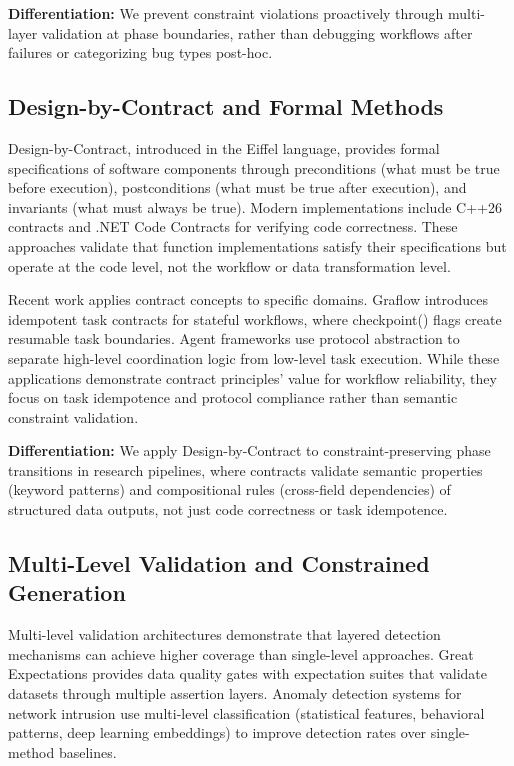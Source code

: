 \textbf{Differentiation:} We prevent constraint violations proactively through multi-layer validation at phase boundaries, rather than debugging workflows after failures or categorizing bug types post-hoc.

\subsection{Design-by-Contract and Formal Methods}

Design-by-Contract, introduced in the Eiffel language, provides formal specifications of software components through preconditions (what must be true before execution), postconditions (what must be true after execution), and invariants (what must always be true). Modern implementations include C++26 contracts and .NET Code Contracts for verifying code correctness. These approaches validate that function implementations satisfy their specifications but operate at the code level, not the workflow or data transformation level.

Recent work applies contract concepts to specific domains. Graflow introduces idempotent task contracts for stateful workflows, where checkpoint() flags create resumable task boundaries. Agent frameworks use protocol abstraction to separate high-level coordination logic from low-level task execution. While these applications demonstrate contract principles' value for workflow reliability, they focus on task idempotence and protocol compliance rather than semantic constraint validation.

\textbf{Differentiation:} We apply Design-by-Contract to constraint-preserving phase transitions in research pipelines, where contracts validate semantic properties (keyword patterns) and compositional rules (cross-field dependencies) of structured data outputs, not just code correctness or task idempotence.

\subsection{Multi-Level Validation and Constrained Generation}

Multi-level validation architectures demonstrate that layered detection mechanisms can achieve higher coverage than single-level approaches. Great Expectations provides data quality gates with expectation suites that validate datasets through multiple assertion layers. Anomaly detection systems for network intrusion use multi-level classification (statistical features, behavioral patterns, deep learning embeddings) to improve detection rates over single-method baselines.

